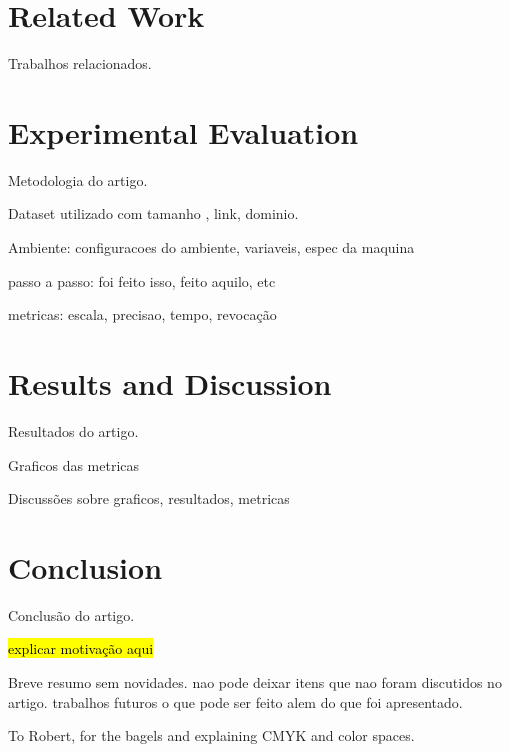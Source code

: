 \documentclass[sigconf]{acmart}
\newcommand{\pending}[1]{\hl{#1}} %
\begin{document}
\section{Related Work}
Trabalhos relacionados.

\section{Experimental Evaluation}
Metodologia do artigo.

Dataset utilizado com tamanho , link, dominio.

Ambiente: configuracoes do ambiente, variaveis, espec da maquina

passo a passo: foi feito isso, feito aquilo, etc

metricas: escala, precisao, tempo, revocação

\section{Results and Discussion}
Resultados do artigo.

Graficos das metricas

Discussões sobre graficos, resultados, metricas


\section{Conclusion}
Conclusão do artigo.

\pending{explicar motivação aqui}

Breve resumo sem novidades. nao pode deixar itens que nao foram discutidos no artigo. 
trabalhos futuros o que pode ser feito alem do que foi apresentado.



\begin{acks}
To Robert, for the bagels and explaining CMYK and color spaces.
\end{acks}



\end{document}
